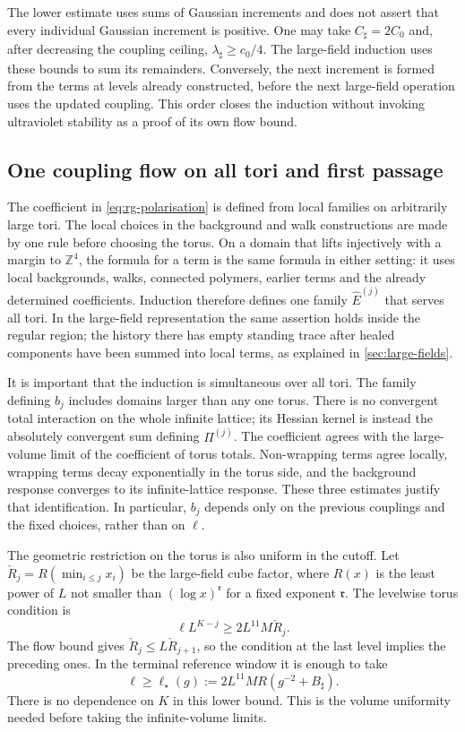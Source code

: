\documentclass[11pt,letterpaper,reqno]{amsart}
\theoremstyle{definition}
\theoremstyle{remark}
\begin{document}
The lower estimate uses sums of Gaussian increments and does
not assert that every individual Gaussian increment is
positive. One may take $C_\sharp=2C_0$ and, after decreasing
the coupling ceiling, $\lambda_\sharp\ge c_0/4$.
The large-field induction uses these bounds to sum its
remainders. Conversely, the next increment is formed from
the terms at levels already constructed, before the next
large-field operation uses the updated coupling. This order
closes the induction without invoking ultraviolet stability
as a proof of its own flow bound.

\subsection{One coupling flow on all tori and first passage}

The coefficient in \eqref{eq:rg-polarisation} is defined from
local families on arbitrarily large tori. The local choices in
the background and walk constructions are made by one rule
before choosing the torus. On a domain that lifts injectively
with a margin to $\mathbb Z^4$, the formula for a term is the
same formula in either setting: it uses local backgrounds,
walks, connected polymers, earlier terms and the already
determined coefficients. Induction therefore defines one
family $\widehat E^{(j)}$ that serves all tori. In the
large-field representation the same assertion holds inside
the regular region; the history there has empty standing
trace after healed components have been summed into local
terms, as explained in \cref{sec:large-fields}.

It is important that the induction is simultaneous over all
tori. The family defining $b_j$ includes domains larger than
any one torus. There is no convergent total interaction on
the whole infinite lattice; its Hessian kernel is instead
the absolutely convergent sum defining $\Pi^{(j)}$.
The coefficient agrees with the large-volume limit of the
coefficient of torus totals. Non-wrapping terms agree
locally, wrapping terms decay exponentially in the torus
side, and the background response converges to its
infinite-lattice response. These three estimates justify
that identification. In particular, $b_j$ depends only on
the previous couplings and the fixed choices, rather than
on $\ell$.

The geometric restriction on the torus is also uniform in
the cutoff. Let $\check R_j=R(\min_{i\le j}x_i)$ be the
large-field cube factor, where $R(x)$ is the least power of
$L$ not smaller than $(\log x)^{\mathfrak r}$ for a fixed exponent
$\mathfrak r$.
The levelwise torus condition is
\begin{equation}\label{eq:prefix-volume}
 \ell L^{K-j}\ge2L^{11}M\check R_j.
\end{equation}
The flow bound gives $\check R_j\le L\check R_{j+1}$,
so the condition at the last level implies the preceding
ones. In the terminal reference window it is enough to take
\begin{equation}\label{eq:flow-volume-floor}
 \ell\ge\ell_\star(g)
 :=2L^{11}M R(g^{-2}+B_\sharp).
\end{equation}
There is no dependence on $K$ in this lower bound. This is
the volume uniformity needed before taking the
infinite-volume limits.
\end{document}

